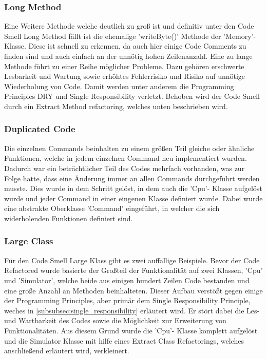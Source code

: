 \documentclass[12pt,a4paper,titlepage,ngerman,pdftex]{report}
\begin{document}
    \subsubsection{Long Method}

    Eine Weitere Methode welche deutlich zu groß ist und definitiv unter den Code Smell Long Method fällt ist die ehemalige 'writeByte()' Methode der 'Memory'- Klasse. Diese ist schnell zu erkennen, da auch hier einige Code Comments zu finden sind und auch einfach an der unnötig hohen Zeilenanzahl.
    Eine zu lange Methode führt zu einer Reihe möglicher Probleme. Dazu gehören erschwerte Lesbarkeit und Wartung sowie erhöhtes Fehlerrisiko und Risiko auf unnötige Wiederholung von Code. Damit werden unter anderem die Programming Principles DRY und Single Responsibility verletzt. 
    Behoben wird der Code Smell durch ein Extract Method refactoring, welches unten beschrieben wird.
    
    \subsubsection{Duplicated Code}

    Die einzelnen Commands beinhalten zu einem größen Teil gleiche oder ähnliche Funktionen, welche in jedem einzelnen Command neu implementiert wurden. Dadurch war ein beträchtlicher Teil des Codes mehrfach vorhanden, was zur Folge hatte,
    dass eine Änderung immer an allen Commands durchgeführt werden musste. Dies wurde in dem Schritt gelöst, in dem auch die 'Cpu'- Klasse aufgelöst wurde und jeder Command in einer eingenen Klasse definiert wurde. 
    Dabei wurde eine abstrakte Oberklasse 'Command' eingeführt, in welcher die sich widerholenden Funktionen definiert sind.

    \subsubsection{Large Class}
    Für den Code Smell Large Klass gibt es zwei auffällige Beispiele. Bevor der Code Refactored wurde basierte der Großteil der Funktionalität auf zwei Klassen, 'Cpu' und 'Simulator', welche beide aus einigen hundert Zeilen Code bestanden und eine große Anzahl an Methoden beinhalteten.
    Dieser Aufbau verstößt gegen einige der Programming Principles, aber primär dem Single Responsibility Principle, weches in \autoref{subsubsec:single_responsibility} erläutert wird. Er stört dabei die Les- und Wartbarkeit des Codes sowie die Möglichkeit zur Erweiterung von Funktionalitäten.
    Aus diesem Grund wurde die 'Cpu'- Klasse komplett aufgelöst und die  Simulator Klasse mit hilfe eines Extract Class Refactorings, welches anschließend erläutert wird, verkleinert.
\end{document}
